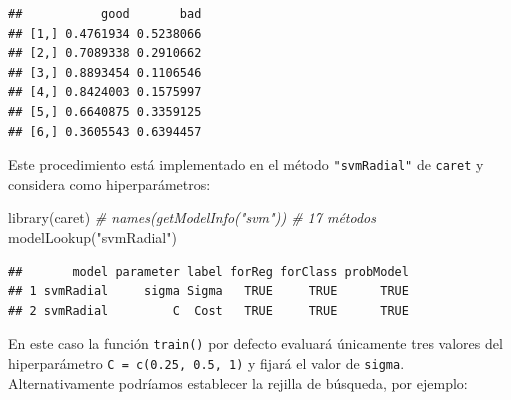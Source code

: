 \documentclass[
  spanish,
]{book}
\newenvironment{Shaded}{\begin{snugshade}}{\end{snugshade}}
\newcommand{\AttributeTok}[1]{\textcolor[rgb]{0.77,0.63,0.00}{#1}}
\newcommand{\CommentTok}[1]{\textcolor[rgb]{0.56,0.35,0.01}{\textit{#1}}}
\newcommand{\ConstantTok}[1]{\textcolor[rgb]{0.00,0.00,0.00}{#1}}
\newcommand{\DecValTok}[1]{\textcolor[rgb]{0.00,0.00,0.81}{#1}}
\newcommand{\FloatTok}[1]{\textcolor[rgb]{0.00,0.00,0.81}{#1}}
\newcommand{\FunctionTok}[1]{\textcolor[rgb]{0.00,0.00,0.00}{#1}}
\newcommand{\NormalTok}[1]{#1}
\newcommand{\OtherTok}[1]{\textcolor[rgb]{0.56,0.35,0.01}{#1}}
\newcommand{\SpecialCharTok}[1]{\textcolor[rgb]{0.00,0.00,0.00}{#1}}
\newcommand{\StringTok}[1]{\textcolor[rgb]{0.31,0.60,0.02}{#1}}
\theoremstyle{break}
\theoremstyle{definition}
\theoremstyle{definition}
\theoremstyle{definition}
\theoremstyle{definition}
\theoremstyle{remark}
\begin{document}
\begin{verbatim}
##           good       bad
## [1,] 0.4761934 0.5238066
## [2,] 0.7089338 0.2910662
## [3,] 0.8893454 0.1106546
## [4,] 0.8424003 0.1575997
## [5,] 0.6640875 0.3359125
## [6,] 0.3605543 0.6394457
\end{verbatim}

Este procedimiento está implementado en el método \texttt{"svmRadial"} de \texttt{caret} y considera como hiperparámetros:

\begin{Shaded}
\begin{Highlighting}[]
\FunctionTok{library}\NormalTok{(caret)}
\CommentTok{\# names(getModelInfo("svm")) \# 17 métodos}
\FunctionTok{modelLookup}\NormalTok{(}\StringTok{"svmRadial"}\NormalTok{)}
\end{Highlighting}
\end{Shaded}

\begin{verbatim}
##       model parameter label forReg forClass probModel
## 1 svmRadial     sigma Sigma   TRUE     TRUE      TRUE
## 2 svmRadial         C  Cost   TRUE     TRUE      TRUE
\end{verbatim}

En este caso la función \texttt{train()} por defecto evaluará únicamente tres valores del hiperparámetro \texttt{C\ =\ c(0.25,\ 0.5,\ 1)} y fijará el valor de \texttt{sigma}.
Alternativamente podríamos establecer la rejilla de búsqueda, por ejemplo:

\begin{Shaded}
\end{Shaded}
\end{document}
